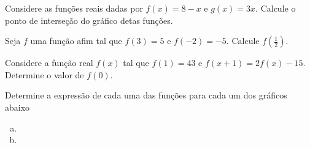 \begin{secExercicios}
    \begin{exer}
        Considere as funções reais dadas por $f(x)=8-x$ e $g(x)=3x$. Calcule o ponto de interseção do gráfico detas funções.
    \end{exer}

    \begin{exer}
        Seja $f$ uma função afim tal que $f(3)=5$ e $f(-2)=-5$. Calcule $f\left(\frac{1}{2}\right)$.
    \end{exer}

    \begin{exer}
        Considere a função real $f(x)$ tal que $f(1)=43$ e $f(x+1)=2f(x)-15$. Determine o valor de $f(0)$.
    \end{exer}

    \begin{exer} Determine a expressão de cada uma das funções para cada um dos gráficos abaixo
        \begin{enumerate}[a)]
            \item 

            \item 


\end{enumerate}
\end{exer}
\end{secExercicios}
